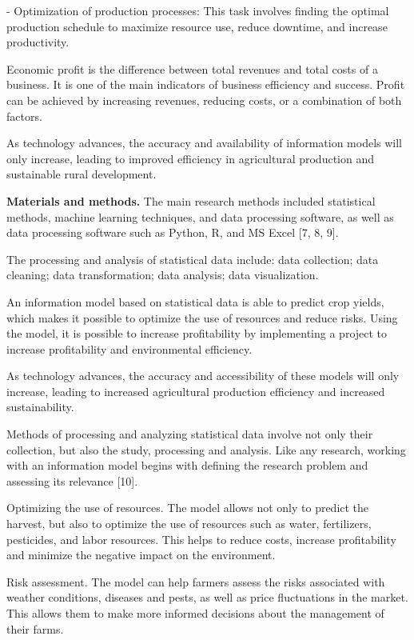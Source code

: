 - Optimization of production processes: This task involves finding the
optimal production schedule to maximize resource use, reduce downtime,
and increase productivity.

Economic profit is the difference between total revenues and total costs
of a business. It is one of the main indicators of business efficiency
and success. Profit can be achieved by increasing revenues, reducing
costs, or a combination of both factors.

As technology advances, the accuracy and availability of information
models will only increase, leading to improved efficiency in
agricultural production and sustainable rural development.

{\bfseries Materials and methods.} The main research methods included
statistical methods, machine learning techniques, and data processing
software, as well as data processing software such as Python, R, and MS
Excel {[}7, 8, 9{]}.

The processing and analysis of statistical data include: data
collection; data cleaning; data transformation; data analysis; data
visualization.

An information model based on statistical data is able to predict crop
yields, which makes it possible to optimize the use of resources and
reduce risks. Using the model, it is possible to increase profitability
by implementing a project to increase profitability and environmental
efficiency.

As technology advances, the accuracy and accessibility of these models
will only increase, leading to increased agricultural production
efficiency and increased sustainability.

Methods of processing and analyzing statistical data involve not only
their collection, but also the study, processing and analysis. Like any
research, working with an information model begins with defining the
research problem and assessing its relevance {[}10{]}.

Optimizing the use of resources. The model allows not only to predict
the harvest, but also to optimize the use of resources such as water,
fertilizers, pesticides, and labor resources. This helps to reduce
costs, increase profitability and minimize the negative impact on the
environment.

Risk assessment. The model can help farmers assess the risks associated
with weather conditions, diseases and pests, as well as price
fluctuations in the market. This allows them to make more informed
decisions about the management of their farms.

